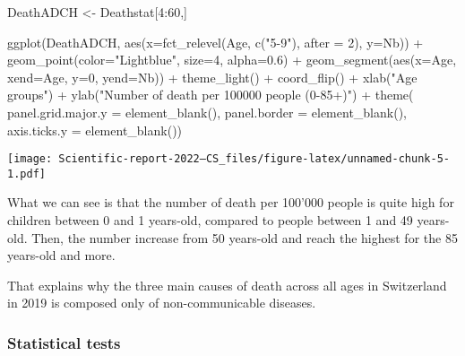 \documentclass[
]{article}
\newenvironment{Shaded}{\begin{snugshade}}{\end{snugshade}}
\newcommand{\AttributeTok}[1]{\textcolor[rgb]{0.77,0.63,0.00}{#1}}
\newcommand{\DecValTok}[1]{\textcolor[rgb]{0.00,0.00,0.81}{#1}}
\newcommand{\FloatTok}[1]{\textcolor[rgb]{0.00,0.00,0.81}{#1}}
\newcommand{\FunctionTok}[1]{\textcolor[rgb]{0.00,0.00,0.00}{#1}}
\newcommand{\NormalTok}[1]{#1}
\newcommand{\OtherTok}[1]{\textcolor[rgb]{0.56,0.35,0.01}{#1}}
\newcommand{\SpecialCharTok}[1]{\textcolor[rgb]{0.00,0.00,0.00}{#1}}
\newcommand{\StringTok}[1]{\textcolor[rgb]{0.31,0.60,0.02}{#1}}
\begin{document}
\begin{Shaded}
\begin{Highlighting}[]
\NormalTok{DeathADCH }\OtherTok{\textless{}{-}}\NormalTok{ Deathstat[}\DecValTok{4}\SpecialCharTok{:}\DecValTok{60}\NormalTok{,]}

\FunctionTok{ggplot}\NormalTok{(DeathADCH, }\FunctionTok{aes}\NormalTok{(}\AttributeTok{x=}\FunctionTok{fct\_relevel}\NormalTok{(Age, }\FunctionTok{c}\NormalTok{(}\StringTok{"5{-}9"}\NormalTok{), }\AttributeTok{after =} \DecValTok{2}\NormalTok{), }\AttributeTok{y=}\NormalTok{Nb)) }\SpecialCharTok{+}
  \FunctionTok{geom\_point}\NormalTok{(}\AttributeTok{color=}\StringTok{"Lightblue"}\NormalTok{, }\AttributeTok{size=}\DecValTok{4}\NormalTok{, }\AttributeTok{alpha=}\FloatTok{0.6}\NormalTok{) }\SpecialCharTok{+} 
  \FunctionTok{geom\_segment}\NormalTok{(}\FunctionTok{aes}\NormalTok{(}\AttributeTok{x=}\NormalTok{Age, }\AttributeTok{xend=}\NormalTok{Age, }\AttributeTok{y=}\DecValTok{0}\NormalTok{, }\AttributeTok{yend=}\NormalTok{Nb)) }\SpecialCharTok{+}
  \FunctionTok{theme\_light}\NormalTok{() }\SpecialCharTok{+}
  \FunctionTok{coord\_flip}\NormalTok{() }\SpecialCharTok{+}
  \FunctionTok{xlab}\NormalTok{(}\StringTok{"Age groups"}\NormalTok{) }\SpecialCharTok{+}
  \FunctionTok{ylab}\NormalTok{(}\StringTok{"Number of death per 100\textquotesingle{}000 people (0{-}85+)"}\NormalTok{) }\SpecialCharTok{+}
  \FunctionTok{theme}\NormalTok{(}
    \AttributeTok{panel.grid.major.y =} \FunctionTok{element\_blank}\NormalTok{(),}
    \AttributeTok{panel.border =} \FunctionTok{element\_blank}\NormalTok{(),}
    \AttributeTok{axis.ticks.y =} \FunctionTok{element\_blank}\NormalTok{())}
\end{Highlighting}
\end{Shaded}

\texttt{[image: Scientific-report-2022---CS\_files/figure-latex/unnamed-chunk-5-1.pdf]}

What we can see is that the number of death per 100'000 people is quite
high for children between 0 and 1 years-old, compared to people between
1 and 49 years-old. Then, the number increase from 50 years-old and
reach the highest for the 85 years-old and more.

That explains why the three main causes of death across all ages in
Switzerland in 2019 is composed only of non-communicable diseases.

\hypertarget{statistical-tests}{%
\subsubsection{Statistical tests}\label{statistical-tests}}
\end{document}
